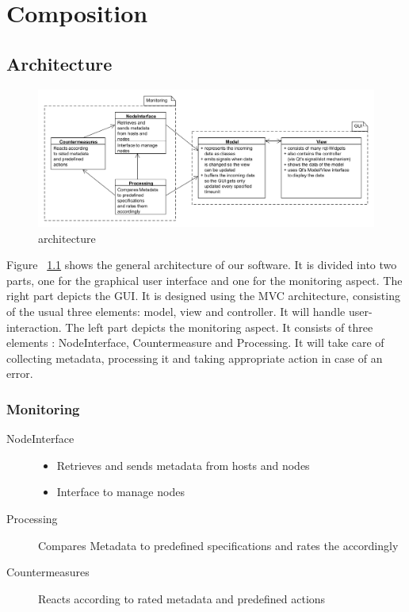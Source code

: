 \chapter{Composition}

\section{Architecture}

\begin{figure}[here]
\includegraphics[width=\linewidth]{./bilder/architektur.png}
\caption{architecture}
\label{fig:architecture}
\end{figure}

Figure ~\ref{fig:architecture} shows the general architecture of our software. It is divided into two parts, one for the graphical user interface and one for the monitoring aspect.
The right part depicts the GUI. It is designed using the MVC architecture, consisting of the usual three elements: model, view and controller. It will handle user-interaction.
The left part depicts the monitoring aspect. It consists of three elements : NodeInterface, Countermeasure and Processing. It will take care of collecting metadata, processing it and taking appropriate action in case of an error.

\subsection{Monitoring}

\begin{description}
	\item[NodeInterface] 
		\begin{itemize}
			\item Retrieves and sends metadata from hosts and nodes
			\item Interface to manage nodes
		\end{itemize}
	\item[Processing] Compares Metadata to predefined specifications and rates the accordingly
	\item[Countermeasures] Reacts according to rated metadata and predefined actions	
\end{description}

